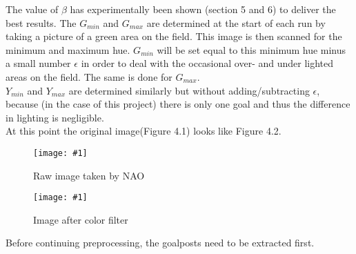 \documentclass{ba-kecs}
\numberwithin{figure}{section}
\numberwithin{equation}{section}
\newcommand{\dkepic}[2]{ %
	\begin{figure}[H] %
	\texttt{[image: \#1]}
	\caption{#2}
	\label{#1}
	\end{figure}
}
\begin{document}
The value of $\beta$ has experimentally been shown (section 5 and 6) to deliver the best results. The $G_{min}$ and $G_{max}$ are determined at the start of each run by taking a picture of a green area on the field. This image is then scanned for the minimum and maximum hue. $G_{min}$ will be set equal to this minimum hue minus a small number $\epsilon$ in order to deal with the occasional over- and under lighted areas on the field. The same is done for $G_{max}$.\\
$Y_{min}$ and $Y_{max}$ are determined similarly but without adding/subtracting $\epsilon$, because (in the case of this project) there is only one goal and thus the difference in lighting is negligible.\\
At this point the original image(Figure 4.1) looks like Figure 4.2.\\
\dkepic{figure_IP1}{Raw image taken by NAO}
\dkepic{figure_IP2}{Image after color filter}
Before continuing preprocessing, the goalposts need to be extracted first.
\end{document}
